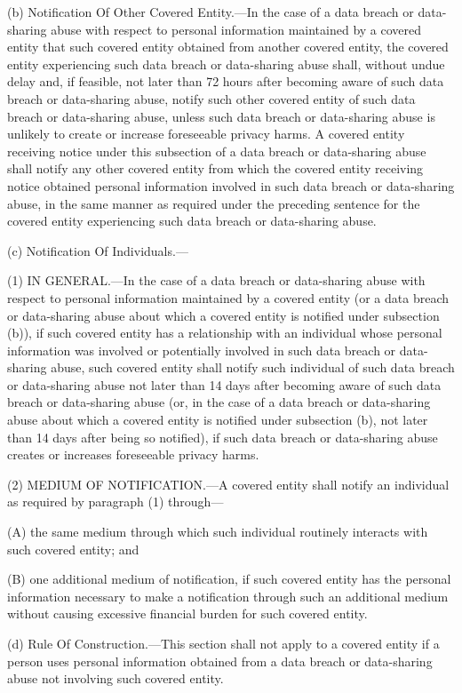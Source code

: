 (b) Notification Of Other Covered Entity.—In the case of a data breach or data-sharing abuse with respect to personal information maintained by a covered entity that such covered entity obtained from another covered entity, the covered entity experiencing such data breach or data-sharing abuse shall, without undue delay and, if feasible, not later than 72 hours after becoming aware of such data breach or data-sharing abuse, notify such other covered entity of such data breach or data-sharing abuse, unless such data breach or data-sharing abuse is unlikely to create or increase foreseeable privacy harms. A covered entity receiving notice under this subsection of a data breach or data-sharing abuse shall notify any other covered entity from which the covered entity receiving notice obtained personal information involved in such data breach or data-sharing abuse, in the same manner as required under the preceding sentence for the covered entity experiencing such data breach or data-sharing abuse.

(c) Notification Of Individuals.—

(1) IN GENERAL.—In the case of a data breach or data-sharing abuse with respect to personal information maintained by a covered entity (or a data breach or data-sharing abuse about which a covered entity is notified under subsection (b)), if such covered entity has a relationship with an individual whose personal information was involved or potentially involved in such data breach or data-sharing abuse, such covered entity shall notify such individual of such data breach or data-sharing abuse not later than 14 days after becoming aware of such data breach or data-sharing abuse (or, in the case of a data breach or data-sharing abuse about which a covered entity is notified under subsection (b), not later than 14 days after being so notified), if such data breach or data-sharing abuse creates or increases foreseeable privacy harms.

(2) MEDIUM OF NOTIFICATION.—A covered entity shall notify an individual as required by paragraph (1) through—

(A) the same medium through which such individual routinely interacts with such covered entity; and

(B) one additional medium of notification, if such covered entity has the personal information necessary to make a notification through such an additional medium without causing excessive financial burden for such covered entity.

(d) Rule Of Construction.—This section shall not apply to a covered entity if a person uses personal information obtained from a data breach or data-sharing abuse not involving such covered entity.

